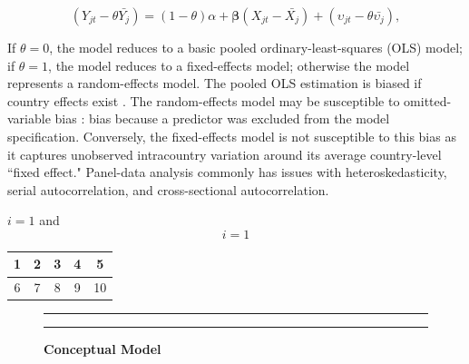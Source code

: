 \documentclass[]{article}
\begin{document}
\begin{equation}
\label{eq:my-random}
    (Y_{jt} - \theta \bar{Y_{j}}) = (1-\theta)\alpha + \bm{\beta}(X_{jt} - \bar{X_{j}}) +  (\upsilon_{jt} - \theta \bar{\upsilon_{j}})  ,
\end{equation}

\noindent If \(\theta = 0\), the model reduces to a basic pooled
ordinary-least-squares (OLS) model; if \(\theta = 1\), the model reduces
to a fixed-effects model; otherwise the model represents a
random-effects model. The pooled OLS estimation is biased if country
effects exist \citep{Hsiao:2003}. The random-effects model may be
susceptible to omitted-variable bias \citep{Wooldridge:2006}: bias
because a predictor was excluded from the model specification.
Conversely, the fixed-effects model is not susceptible to this bias as
it captures unobserved intracountry variation around its average
country-level ``fixed effect." Panel-data analysis commonly has issues
with heteroskedasticity, serial autocorrelation, and cross-sectional
autocorrelation.

\vspace{0.5in}

\(i=1\) and \[i = 1\]

\vspace{0.5in}

\begin{tabular}{ c c c c c}
  1 & 2 & 3 & 4 & 5 \\
  \hline
  6 & 7 & 8 & 9 & 10
\end{tabular}

\vspace{0.5in}

\begin{figure}[!ht]
    \hrule
    \caption{ \textbf{Conceptual Model} }
    \begin{center}
    \end{center}
    \label{fig:conceptual-model}
    \hrule
\end{figure}
\end{document}
